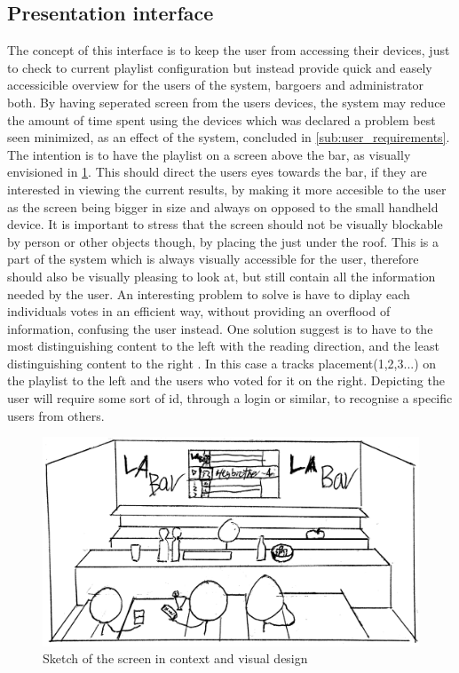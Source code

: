 \subsection{Presentation interface}

The concept of this interface is to keep the user from accessing their devices, just to check to current playlist configuration but instead provide quick and easely accessicible overview for the users of the system, bargoers and administrator both. By having seperated screen from the users devices, the system may reduce the amount of time spent using the devices which was declared a problem best seen minimized, as an effect of the system, concluded in \cref{sub:user_requirements}. The intention is to have the playlist on a screen above the bar, as visually envisioned in \cref{fig:PresentationInterface}. This should direct the users eyes towards the bar, if they are interested in viewing the current results, by making it more accesible to the user as the screen being bigger in size and always on opposed to the small handheld device\cite{DEB}. It is important to stress that the screen should not be visually blockable by person or other objects though, by placing the just under the roof. 
This is a part of the system which is always visually accessible for the user, therefore should also be visually pleasing to look at, but still contain all the information needed by the user. An interesting problem to solve is have to diplay each individuals votes in an efficient way, without providing an overflood of information, confusing the user instead. One solution suggest is to have to the most distinguishing content to the left with the reading direction, and the least distinguishing content to the right \cite{material}. In this case a tracks placement(1,2,3...) on the playlist to the left and the users who voted for it on the right. Depicting the user will require some sort of id, through a login or similar, to recognise a specific users from others.

\begin{figure}[hbtp]
  \centering
  \includegraphics[width=1.0\linewidth]{Images/presentation.png}
  \caption{Sketch of the screen in context and visual design}\label{fig:PresentationInterface}
\end{figure}
